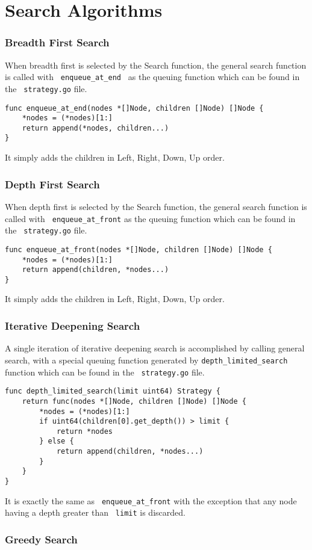 \documentclass[14pt,a4paper]{report}
\begin{document}
\part{Search Algorithms}
\section{Breadth First Search}
When breadth first is selected by the Search function, the general search function is called
with \verb+ enqueue_at_end + as the queuing function which can be found in the \verb+ strategy.go+ file.
\begin{lstlisting}
func enqueue_at_end(nodes *[]Node, children []Node) []Node {
    *nodes = (*nodes)[1:]
    return append(*nodes, children...)
}
\end{lstlisting}
It simply adds the children in Left, Right, Down, Up order.
\section{Depth First Search}
When depth first is selected by the Search function, the general search function is called
with \verb+ enqueue_at_front+ as the queuing function which can be found in the \verb+ strategy.go+ file.
\begin{lstlisting}
func enqueue_at_front(nodes *[]Node, children []Node) []Node {
    *nodes = (*nodes)[1:]
    return append(children, *nodes...)
}
\end{lstlisting}
It simply adds the children in Left, Right, Down, Up order.
\section{Iterative Deepening Search}
A single iteration of iterative deepening search is accomplished by calling general search,
with a special queuing function generated by \verb+depth_limited_search+ function which can be 
found in the \verb+ strategy.go+ file.
\begin{lstlisting}
func depth_limited_search(limit uint64) Strategy {
    return func(nodes *[]Node, children []Node) []Node {
        *nodes = (*nodes)[1:]
        if uint64(children[0].get_depth()) > limit {
            return *nodes
        } else {
            return append(children, *nodes...)
        }
    }
} 
\end{lstlisting}
It is exactly the same as \verb+ enqueue_at_front+ with the exception that any node
having a depth greater than \verb+ limit+ is discarded.
\section{Greedy Search}
\end{document}
